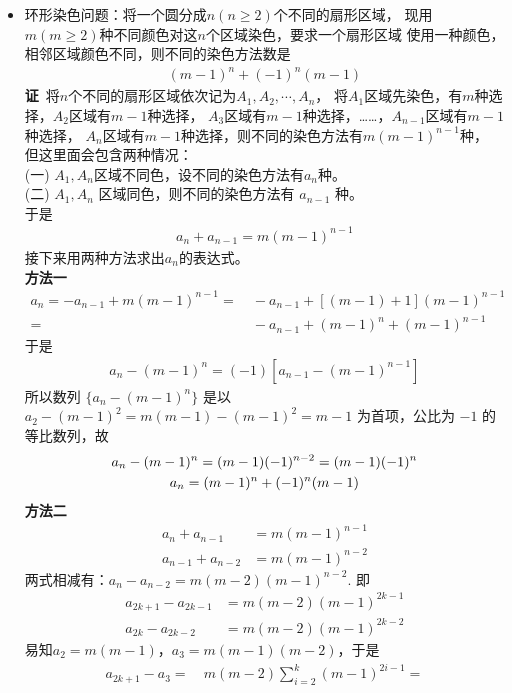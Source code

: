 \begin{itemize}[leftmargin=\inteval{\myitemleftmargin}pt,itemsep=
   \inteval{\myitemitempsep}pt,topsep=\inteval{\myitemtopsep}pt]
\item 环形染色问题：将一个圆分成$n(n\geq 2)$个不同的扇形区域，
现用$m(m\geq 2)$种不同颜色对这$n$个区域染色，要求一个扇形区域
使用一种颜色，相邻区域颜色不同，则不同的染色方法数是
\begin{gather}\label{环形染色方法数公式}
    (m-1)^n + (-1)^n(m-1) 
\end{gather}
\textbf{证}\ 将$n$个不同的扇形区域依次记为$A_1,A_2,\cdots,A_n$，
将$A_1$区域先染色，有$m$种选择，$A_2$区域有$m-1$种选择，
$A_3$区域有$m-1$种选择，……，$A_{n-1}$区域有$m-1$种选择，
$A_n$区域有$m-1$种选择，则不同的染色方法有$m(m-1)^{n-1}$种，
但这里面会包含两种情况：\\
(一) $A_1,A_n$区域不同色，设不同的染色方法有$a_n$种。\\
(二) $ A_1,A_n $ 区域同色，则不同的染色方法有 $ a_{n-1} $ 种。\\
于是
\begin{gather*}
    a_n+a_{n-1} = m(m-1)^{n-1} 
\end{gather*}
接下来用两种方法求出$a_n$的表达式。\\
\textbf{方法一}
\begin{align*}
    a_n=-a_{n-1} + m(m-1)^{n-1} =&\ -a_{n-1}+[(m-1)+1](m-1)^{n-1}\\
    =&\ -a_{n-1} + (m-1)^n + (m-1)^{n-1}
\end{align*}
于是
\begin{align*}
    a_n - (m-1)^n = (-1)\left[a_{n-1} - (m-1)^{n-1}\right]
\end{align*}
所以数列 $\{a_n - (m-1)^n\}$ 是以$a_2-(m-1)^2 = m(m-1)-(m-1)^2=m-1$
为首项，公比为 $-1$ 的等比数列，故
\begin{gather}
    a_n - (m-1)^n = (m-1)(-1)^{n-2} = (m-1)(-1)^n \notag \\
    a_n = (m-1)^n + (-1)^n(m-1) \label{环形染色-an统一表达式}
\end{gather}
\textbf{方法二}
\begin{align*}
    a_n+a_{n-1} &= m(m-1)^{n-1}  \\
    a_{n-1}+a_{n-2} &= m(m-1)^{n-2} 
\end{align*}
两式相减有：$a_{n}-a_{n-2}=m(m-2)(m-1)^{n-2} $. 即
\begin{align*}
    a_{2k+1}-a_{2k-1} &= m(m-2)(m-1)^{2k-1} \\
    a_{2k}-a_{2k-2}   &= m(m-2)(m-1)^{2k-2} 
\end{align*}
易知$a_2=m(m-1)$，$a_3=m(m-1)(m-2)$，于是
\begin{align*}
    a_{2k+1}-a_3=&\ m(m-2)\sum_{i=2}^{k}(m-1)^{2i-1}=

\end{align*}
\end{itemize}
